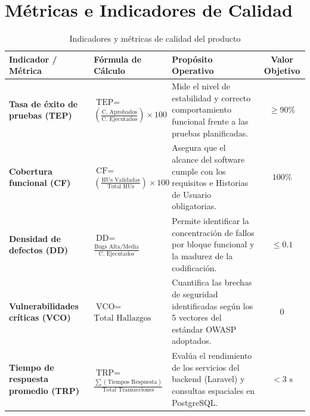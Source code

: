 \section{Métricas e Indicadores de Calidad}

\begin{table}[H]
\centering
\small
\begin{tabularx}{\textwidth}{p{3.0cm} >{\centering\arraybackslash}p{4.6cm} X c}
\toprule
\textbf{Indicador / Métrica} & \textbf{Fórmula de Cálculo} & \textbf{Propósito Operativo} & \textbf{Valor Objetivo} \\
\midrule
\textbf{Tasa de éxito de pruebas (TEP)} & 
$\text{TEP} =$ \newline $\left( \frac{\text{C. Aprobados}}{\text{C. Ejecutados}} \right) \times 100$ & 
Mide el nivel de estabilidad y correcto comportamiento funcional frente a las pruebas planificadas. & 
$\ge 90\%$ \\
\midrule
\textbf{Cobertura funcional (CF)} & 
$\text{CF} =$ \newline $\left( \frac{\text{HUs Validadas}}{\text{Total HUs}} \right) \times 100$ & 
Asegura que el alcance del software cumple con los requisitos e Historias de Usuario obligatorias. & 
$100\%$ \\
\midrule
\textbf{Densidad de defectos (DD)} & 
$\text{DD} =$ \newline $\frac{\text{Bugs Alta/Media}}{\text{C. Ejecutados}}$ & 
Permite identificar la concentración de fallos por bloque funcional y la madurez de la codificación. & 
$\le 0.1$ \\
\midrule
\textbf{Vulnerabilidades críticas (VCO)} & 
$\text{VCO} =$ \newline $\text{Total Hallazgos OWASP}$ & 
Cuantifica las brechas de seguridad identificadas según los 5 vectores del estándar OWASP adoptados. & 
$0$ \\
\midrule
\textbf{Tiempo de respuesta promedio (TRP)} & 
$\text{TRP} =$ \newline $\frac{\sum(\text{Tiempos Respuesta})}{\text{Total Transacciones}}$ & 
Evalúa el rendimiento de los servicios del backend (Laravel) y consultas espaciales en PostgreSQL. & 
$< 3\text{ s}$ \\
\bottomrule
\end{tabularx}
\caption{Indicadores y métricas de calidad del producto}
\label{tab:metricas_calidad}
\end{table}

